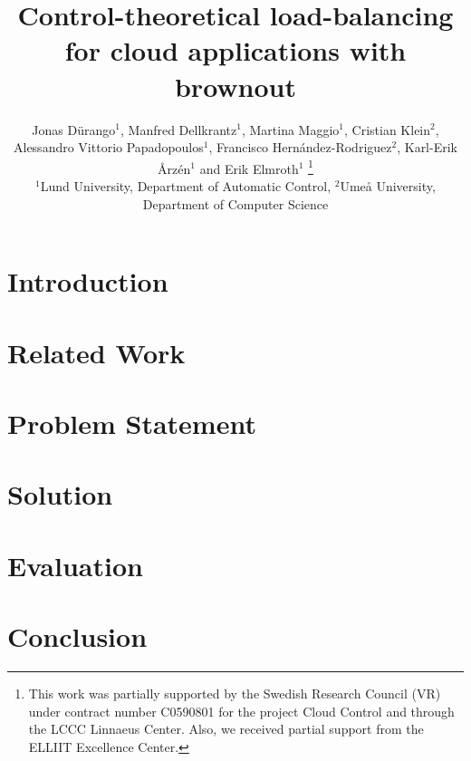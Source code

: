 \documentclass[letterpaper, 10 pt, conference]{ieeeconf}
\title{\LARGE \bf Control-theoretical load-balancing for cloud applications with brownout}
\author{Jonas D{\"u}rango{$^1$}, Manfred Dellkrantz{$^1$}, Martina Maggio{$^1$}, Cristian Klein{$^2$}, \\
Alessandro Vittorio Papadopoulos{$^1$}, Francisco Hern{\'a}ndez-Rodriguez{$^2$}, Karl-Erik {\AA}rz\'en{$^1$} and Erik Elmroth{$^1$} \thanks{This work was partially supported by the Swedish Research Council
  (VR) under contract number C0590801 for the project Cloud Control
  and through the LCCC Linnaeus Center. Also, we received partial
  support from the ELLIIT Excellence Center.}\\
{\small {$^1$}Lund University, Department of Automatic Control, {$^2$}Ume{\aa} University, Department of Computer Science}}
\begin{document}
\maketitle
\thispagestyle{empty}
\pagestyle{empty}

\begin{abstract}

\end{abstract}

\section{Introduction}
\label{sec:introduction}


\section{Related Work}
\label{sec:related}


\section{Problem Statement}
\label{sec:problem}


\section{Solution}
\label{sec:solution}


\section{Evaluation}
\label{sec:evaluation}


\section{Conclusion}
\label{sec:conclusion}


\printbibliography
\end{document}
